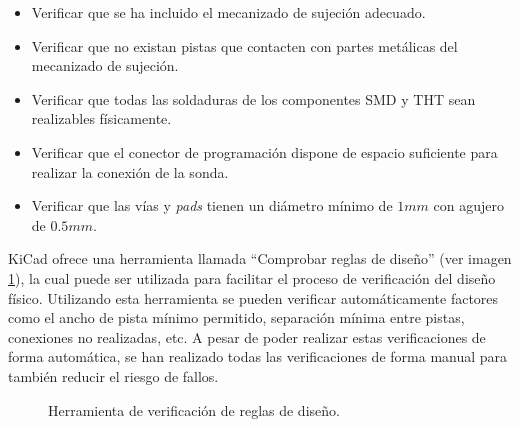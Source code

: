 \begin{itemize}
    \item Verificar que se ha incluido el mecanizado de sujeción adecuado.
    
    \item Verificar que no existan pistas que contacten con partes metálicas del mecanizado de sujeción.
    
    \item Verificar que todas las soldaduras de los componentes \ac{SMD} y \ac{THT} sean realizables físicamente.
    
    \item Verificar que el conector de programación dispone de espacio suficiente para realizar la conexión de la sonda.
    
    \item Verificar que las vías y \textit{pads} tienen un diámetro mínimo de $1mm$ con agujero de $0.5mm$.
    
\end{itemize}

KiCad ofrece una herramienta llamada ``Comprobar reglas de diseño'' (ver imagen \ref{fig:Reglas_Diseño}), la cual puede ser utilizada para facilitar el proceso de verificación del diseño físico. Utilizando esta herramienta se pueden verificar automáticamente factores como el ancho de pista mínimo permitido, separación mínima entre pistas, conexiones no realizadas, etc. A pesar de poder realizar estas verificaciones de forma automática, se han realizado todas las verificaciones de forma manual para también reducir el riesgo de fallos.

\begin{figure}[htbp]
\centering
{}
\caption{Herramienta de verificación de reglas de diseño.}
\label{fig:Reglas_Diseño}
\end{figure}

